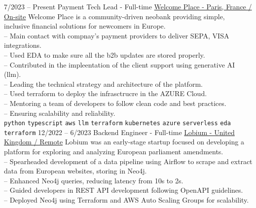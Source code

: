 \vspace{0.2cm}


\begin{entrylist}
    \entry
    {7/2023 -- Present}
    {Payment Tech Lead - Full-time}
    {
        \href{https://www.linkedin.com/company/welcome-place/}{Welcome Place - Paris, France / On-site}}
    {
        Welcome Place is a community-driven neobank providing simple, inclusive financial solutions for newcomers in Europe. \\
        -- Main contact with compnay's payment providers to deliver SEPA, VISA integrations.\\
        -- Used EDA to make sure all the b2b updates are stored properly.\\
        -- Contributed in the impleentation of the client support using generative AI (llm).\\
        -- Leading the technical strategy and architecture of the platform. \\
        -- Used terraform to deploy the infrasctrucre in the AZURE Cloud. \\
        -- Mentoring a team of developers to follow clean code and best practices. \\
        -- Ensuring scalability and reliability. \\
        \texttt{python}\slashsep
        \texttt{typescript}\slashsep
        \texttt{aws}\slashsep
        \texttt{llm}\slashsep
        \texttt{terraform}\slashsep
        \texttt{kubernetes}\slashsep
        \texttt{azure}\slashsep
        \texttt{serverless}\slashsep
        \texttt{eda}\slashsep
        \texttt{terraform}\slashsep
    }
    \entry
    {12/2022 -- 6/2023}
    {Backend Engineer - Full-time}
    {
        \href{https://www.linkedin.com/company/lobium/}{Lobium - United Kingdom / Remote}}
    {
        Lobium was an early-stage startup focused on developing a platform for exploring and analyzing European parliament amendments. \\
        -- Spearheaded development of a data pipeline using Airflow to scrape and extract data from European websites, storing in Neo4j. \\
        -- Enhanced Neo4j queries, reducing latency from 10s to 2s. \\
        -- Guided developers in REST API development following OpenAPI guidelines. \\
        -- Deployed Neo4j using Terraform and AWS Auto Scaling Groups for scalability. \\
}
\end{entrylist}
